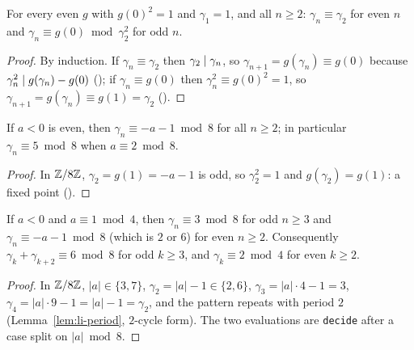 \begin{lemma}
  \label{lem:li-modsq}
  \leanok
  For every even $g$ with $g(0)^2 = 1$ and $\gamma_1 = 1$, and all $n \ge 2$:
  $\gamma_n \equiv \gamma_2$ for even $n$ and $\gamma_n \equiv g(0) \bmod \gamma_2^2$ for odd $n$.
\end{lemma}
\begin{proof}
  \leanok
  By induction. If $\gamma_n \equiv \gamma_2$ then $\gamma_2 \mathrel{\mid} \gamma_n$, so
  $\gamma_{n+1} = g(\gamma_n) \equiv g(0)$ because $\gamma_n^2 \mathrel{\mid} g(\gamma_n) - g(0)$
  (); if $\gamma_n \equiv g(0)$ then
  $\gamma_n^2 \equiv g(0)^2 = 1$, so $\gamma_{n+1} = g(\gamma_n) \equiv g(1) = \gamma_2$
  ().
\end{proof}

\begin{lemma}[$a$ even]
  \label{lem:li-mod8-2}
  \leanok
  If $a < 0$ is even, then $\gamma_n \equiv -a - 1 \bmod 8$ for all $n \ge 2$; in particular
  $\gamma_n \equiv 5 \bmod 8$ when $a \equiv 2 \bmod 8$.
\end{lemma}
\begin{proof}
  \leanok
  In $\mathbb{Z}/8\mathbb{Z}$, $\gamma_2 = g(1) = -a - 1$ is odd, so $\gamma_2^2 = 1$ and $g(\gamma_2) = g(1)$:
  a fixed point ().
\end{proof}

\begin{lemma}
  \label{lem:li-mod8-1}
  \leanok
  If $a < 0$ and $a \equiv 1 \bmod 4$, then $\gamma_n \equiv 3 \bmod 8$ for odd $n \ge 3$ and
  $\gamma_n \equiv -a - 1 \bmod 8$ (which is $2$ or $6$) for even $n \ge 2$. Consequently
  $\gamma_k + \gamma_{k+2} \equiv 6 \bmod 8$ for odd $k \ge 3$, and $\gamma_k \equiv 2 \bmod 4$ for
  even $k \ge 2$.
\end{lemma}
\begin{proof}
  \leanok
  In $\mathbb{Z}/8\mathbb{Z}$, $|a| \in \{3, 7\}$, $\gamma_2 = |a| - 1 \in \{2, 6\}$, $\gamma_3 = |a| \cdot 4 - 1
  = 3$, $\gamma_4 = |a| \cdot 9 - 1 = |a| - 1 = \gamma_2$, and the pattern repeats with period $2$
  (Lemma~\ref{lem:li-period}, $2$-cycle form). The two evaluations are \texttt{decide} after a
  case split on $|a| \bmod 8$.
\end{proof}

